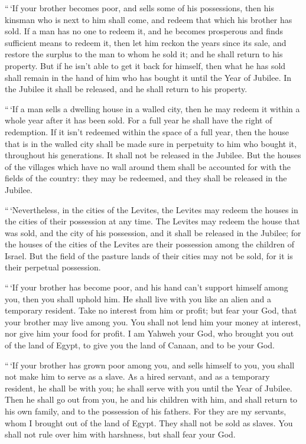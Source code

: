  ``\,`If your brother becomes poor, and sells some of his
possessions, then his kinsman who is next to him shall come, and redeem
that which his brother has sold.  If a man has no one to
redeem it, and he becomes prosperous and finds sufficient means to
redeem it,  then let him reckon the years since its sale,
and restore the surplus to the man to whom he sold it; and he shall
return to his property.  But if he isn't able to get it
back for himself, then what he has sold shall remain in the hand of him
who has bought it until the Year of Jubilee. In the Jubilee it shall be
released, and he shall return to his property.

 ``\,`If a man sells a dwelling house in a walled city,
then he may redeem it within a whole year after it has been sold. For a
full year he shall have the right of redemption.  If it
isn't redeemed within the space of a full year, then the house that is
in the walled city shall be made sure in perpetuity to him who bought
it, throughout his generations. It shall not be released in the Jubilee.
 But the houses of the villages which have no wall around
them shall be accounted for with the fields of the country: they may be
redeemed, and they shall be released in the Jubilee.

 ``\,`Nevertheless, in the cities of the Levites, the
Levites may redeem the houses in the cities of their possession at any
time.  The Levites may redeem the house that was sold, and
the city of his possession, and it shall be released in the Jubilee; for
the houses of the cities of the Levites are their possession among the
children of Israel.  But the field of the pasture lands of
their cities may not be sold, for it is their perpetual possession.

 ``\,`If your brother has become poor, and his hand can't
support himself among you, then you shall uphold him. He shall live with
you like an alien and a temporary resident.  Take no
interest from him or profit; but fear your God, that your brother may
live among you.  You shall not lend him your money at
interest, nor give him your food for profit.  I am Yahweh
your God, who brought you out of the land of Egypt, to give you the land
of Canaan, and to be your God.

 ``\,`If your brother has grown poor among you, and sells
himself to you, you shall not make him to serve as a slave.
 As a hired servant, and as a temporary resident, he shall
be with you; he shall serve with you until the Year of Jubilee.
 Then he shall go out from you, he and his children with
him, and shall return to his own family, and to the possession of his
fathers.  For they are my servants, whom I brought out of
the land of Egypt. They shall not be sold as slaves.  You
shall not rule over him with harshness, but shall fear your God.

